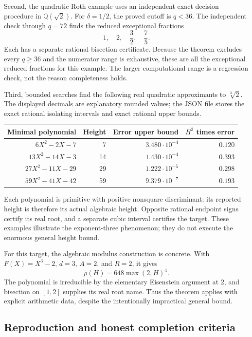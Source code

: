Second, the quadratic Roth example uses an independent exact decision
procedure in $\mathbb Q(\sqrt2)$.  For $\delta=1/2$, the proved cutoff is
$q<36$.  The independent check through $q=72$ finds the reduced exceptional
fractions
\[
 1,\quad 2,\quad \frac32,\quad\frac75.
\]
Each has a separate rational bisection certificate.  Because the theorem
excludes every $q\geq36$ and the numerator range is exhaustive, these are
all the exceptional reduced fractions for this example.  The larger
computational range is a regression check, not the reason completeness holds.

Third, bounded searches find the following real quadratic approximants to
$\sqrt[3]{2}$.  The displayed decimals are explanatory rounded values; the
JSON file stores the exact rational isolating intervals and exact rational
upper bounds.

\begin{center}
\begin{tabular}{@{}rrrr@{}}
\toprule
Minimal polynomial & Height & Error upper bound & $H^3$ times error\\
\midrule
$6X^2-2X-7$ & 7 & $3.480\cdot10^{-4}$ & $0.120$\\
$13X^2-14X-3$ & 14 & $1.430\cdot10^{-4}$ & $0.393$\\
$27X^2-11X-29$ & 29 & $1.222\cdot10^{-5}$ & $0.298$\\
$59X^2-41X-42$ & 59 & $9.379\cdot10^{-7}$ & $0.193$\\
\bottomrule
\end{tabular}
\end{center}

Each polynomial is primitive with positive nonsquare discriminant; its
reported height is therefore its actual algebraic height.  Opposite rational
endpoint signs certify its real root, and a separate cubic interval certifies
the target.  These examples illustrate the exponent-three phenomenon; they
do not execute the enormous general height bound.

For this target, the algebraic modulus construction is concrete.  With
$F(X)=X^3-2$, $d=3$, $A=2$, and $R=2$, it gives
\[
 \rho(H)=648\max(2,H)^4.
\]
The polynomial is irreducible by the elementary Eisenstein argument at $2$,
and bisection on $[1,2]$ supplies its real root name.  Thus the theorem applies
with explicit arithmetic data, despite the intentionally impractical general
bound.

\subsection{Reproduction and honest completion criteria}

